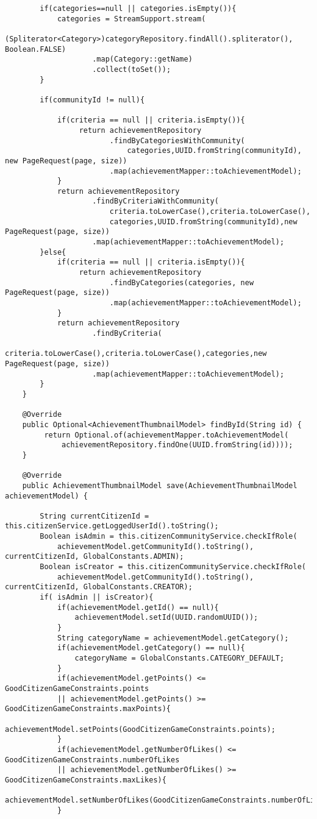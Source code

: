 \begin {lstlisting}
		if(categories==null || categories.isEmpty()){
			categories = StreamSupport.stream(
					(Spliterator<Category>)categoryRepository.findAll().spliterator(), Boolean.FALSE)
					.map(Category::getName)
					.collect(toSet());
		}

		if(communityId != null){
	
			if(criteria == null || criteria.isEmpty()){
				 return achievementRepository
						.findByCategoriesWithCommunity(
                            categories,UUID.fromString(communityId), new PageRequest(page, size))
						.map(achievementMapper::toAchievementModel);
			}
			return achievementRepository
					.findByCriteriaWithCommunity(
                        criteria.toLowerCase(),criteria.toLowerCase(),
                        categories,UUID.fromString(communityId),new PageRequest(page, size))
					.map(achievementMapper::toAchievementModel);
		}else{
			if(criteria == null || criteria.isEmpty()){
				 return achievementRepository
						.findByCategories(categories, new PageRequest(page, size))
						.map(achievementMapper::toAchievementModel);
			}
			return achievementRepository
					.findByCriteria(
                        criteria.toLowerCase(),criteria.toLowerCase(),categories,new PageRequest(page, size))
					.map(achievementMapper::toAchievementModel);
		}
	}

	@Override
	public Optional<AchievementThumbnailModel> findById(String id) {
		 return Optional.of(achievementMapper.toAchievementModel(
             achievementRepository.findOne(UUID.fromString(id))));
	}

	@Override
	public AchievementThumbnailModel save(AchievementThumbnailModel achievementModel) {
		
		String currentCitizenId = this.citizenService.getLoggedUserId().toString();	
		Boolean isAdmin = this.citizenCommunityService.checkIfRole(
            achievementModel.getCommunityId().toString(), currentCitizenId, GlobalConstants.ADMIN);
		Boolean isCreator = this.citizenCommunityService.checkIfRole(
            achievementModel.getCommunityId().toString(), currentCitizenId, GlobalConstants.CREATOR);
		if( isAdmin || isCreator){
			if(achievementModel.getId() == null){
				achievementModel.setId(UUID.randomUUID());
			}
			String categoryName = achievementModel.getCategory();
			if(achievementModel.getCategory() == null){
				categoryName = GlobalConstants.CATEGORY_DEFAULT;
			}
			if(achievementModel.getPoints() <= GoodCitizenGameConstraints.points 
            || achievementModel.getPoints() >= GoodCitizenGameConstraints.maxPoints){
				achievementModel.setPoints(GoodCitizenGameConstraints.points);
			}
			if(achievementModel.getNumberOfLikes() <= GoodCitizenGameConstraints.numberOfLikes 
            || achievementModel.getNumberOfLikes() >= GoodCitizenGameConstraints.maxLikes){
				achievementModel.setNumberOfLikes(GoodCitizenGameConstraints.numberOfLikes);
			}
			

\end{lstlisting}
